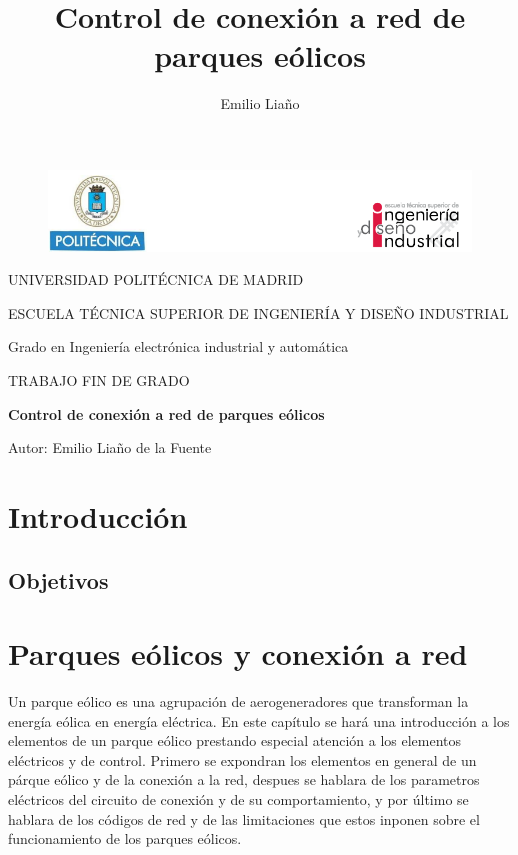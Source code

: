 \documentclass{book}
\title{Control de conexi\'on a red de parques e\'olicos}
\date{}
\author{Emilio Lia\~no}
\begin{document}
\begin{figure}[h!]
\centering
\includegraphics[width=\textwidth]{Encabezado.PNG}
\end{figure}
\begin{center}
\LARGE
UNIVERSIDAD POLIT\'ECNICA DE MADRID \par
\vspace {10 mm}
ESCUELA T\'ECNICA SUPERIOR DE INGENIER\'IA Y DISEÑO INDUSTRIAL\par
\vspace {10 mm}
\LARGE
Grado en Ingenier\'ia electr\'onica industrial y autom\'atica \par
\vspace {10 mm}
\Huge
TRABAJO FIN DE GRADO \par
\vspace{20 mm}
\LARGE
\textbf{Control de conexi\'on a red de parques e\'olicos}\par
\vspace {10 mm}
Autor: Emilio Liaño de la Fuente \par
\vspace {10 mm}
\end{center}
\newpage
   \par
\newpage
\normalsize
{}
\tableofcontents
\chapter{Introducci\'on}
	\section{Objetivos}
\chapter{Parques e\'olicos y conexi\'on a red}
Un parque e\'olico es una agrupaci\'on de aerogeneradores que transforman la energ\'ia e\'olica en energ\'ia el\'ectrica. En este cap\'itulo se har\'a una introducci\'on a los elementos de un parque e\'olico prestando especial atenci\'on a los elementos el\'ectricos y de control. Primero se expondran los elementos en general de un p\'arque e\'olico y de la conexi\'on a la red, despues se hablara de los parametros el\'ectricos del circuito de conexi\'on y de su comportamiento, y por \'ultimo se hablara de los c\'odigos de red y de las limitaciones que estos inponen sobre el funcionamiento de los parques e\'olicos.  
\end{document}
